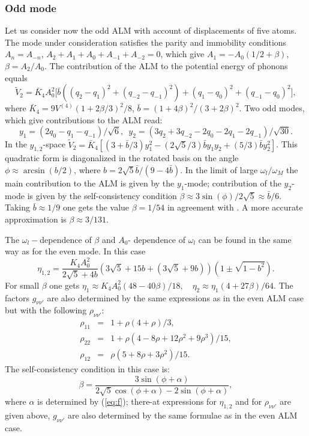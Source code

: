 \subsubsection{Odd mode}
Let us consider now the odd ALM with account of displacements of five atoms. 
The mode under consideration satisfies the parity and immobility conditions 
$A_n=A_{-n}$, $A_2+A_1+A_0+A_{-1}+A_{-2}=0$, which give 
$A_1=-A_0 (1/2 + \beta)$, $\beta = A_2/A_0$. The contribution of the ALM to 
the potential energy of phonons equals 
$$ 
\tilde{V}_2 = \bar{K}_4 A_0^2 {\Big [}
\bar{b}((q_2-q_1)^2 + (q_{-2} - q_{-1})^2) +  
(q_1-q_0)^2 + (q_{-1} -q_0)^2{\Big ]}, 
$$ 
where $\bar{K}_4=9V^{(4)}(1+2\beta/3)^2/8$, 
$\bar{b}=(1+4\beta)^2/(3+2\beta)^2$. Two odd modes, which give contributions 
to the ALM read: 
$$ 
y_1=(2q_0 -q_1-q_{-1})/\sqrt{6},\,\,\, 
y_2=(3q_2 + 3q_{-2} - 2q_0 - 2q_1- 2q_{-1})/\sqrt{30}. 
$$ 
In the $y_{1,2}$-space  $\tilde{V}_2 = \bar{K}_4 [(3+\bar{b}/3)y_1^2 -  
(2\sqrt{5}/3)\bar{b} y_1 y_2 + (5/3) \bar{b} y_2^2]$. This quadratic form is 
diagonalized in the rotated basis on the angle  $\phi \approx
\arcsin{(b/2)}$,
where $b = 2\sqrt{5}\bar{b}/(9-4\bar{b})$. In the limit
of large $\omega_l/\omega_M$ the main contribution to the ALM is given by
the $y_1$-mode; contribution of the $y_2$-mode is given by the self-consistency
condition 
$\beta \approx 3\sin{(\phi)}/ 2\sqrt{5} \approx \bar{b}/6$. Taking 
$\bar{b} \approx 1/9$ one gets the value $\beta = 1/54$ in agreement 
with \cite{page}. A more 
accurate approximation is $\beta \approx 3/131$. 

The $\omega_l-$dependence of 
$\beta$ and $A_0$- dependence of $\omega_l$ can be found in the same way 
as for the even mode. In this case 
$$
\eta_{1,2} = \frac{K_4A_0^2}{2\sqrt{5} + 4b} (3\sqrt{5} +15 b + 
(3\sqrt{5} + 9 b))(1 \pm \sqrt{1-b^2}).
$$
For small $\beta$ one gets
$
\eta_1 \approx K_4A_0^2 (48 - 40\beta)/18,
\quad \eta_2 \approx \eta_1 (4+ 27 \beta)/64.
$
The factors $g_{\nu \nu'}$ are also determined by the same expressions 
as in the even ALM case but
with the following $\rho_{\nu\nu'}$:
\begin{eqnarray}
\rho_{11} &=& 1+ \rho (4 +\rho)/3,\nonumber \\
\rho_{22} &=& 1+ \rho (4 -8 \rho + 
12 \rho^2 + 9 \rho^3)/ 15,
\nonumber \\
\rho_{12} &=& \rho (5 + 8\rho + 3\rho^2)/15. \nonumber
\end{eqnarray}
The self-consistency condition in this case is:
\begin{equation}
\beta =\frac{3 \sin{(\phi+\alpha)}}{2\sqrt{5} \cos{(\phi+\alpha)} 
-2\sin{(\phi+\alpha)}},
\end{equation}
where $\alpha$ is determined by (\ref{eq:f}); there-at  expressions for
$\eta_{1,2}$  and for $\rho_{\nu\nu'}$ are given above,
$g_{\nu\nu'}$ are also determined by the same formulae as in the even ALM case.

